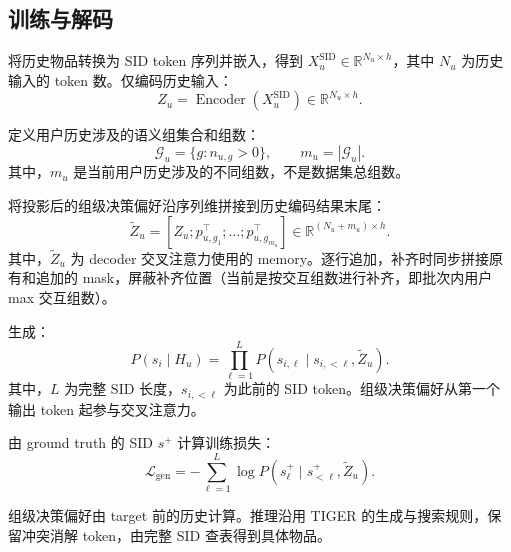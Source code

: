\documentclass[UTF8,11pt,a4paper]{ctexart}
\begin{document}
\subsection{训练与解码}

将历史物品转换为 SID token 序列并嵌入，得到 $X_u^{\mathrm{SID}}\in\mathbb R^{N_u\times h}$，其中 $N_u$ 为历史输入的 token 数。仅编码历史输入：
\begin{equation}
 Z_u=\operatorname{Encoder}(X_u^{\mathrm{SID}})
 \in\mathbb R^{N_u\times h}.
\end{equation}

定义用户历史涉及的语义组集合和组数：
\begin{equation}
 \mathcal G_u=\{g:n_{u,g}>0\},\qquad m_u=|\mathcal G_u|.
\end{equation}
其中，$m_u$ 是当前用户历史涉及的不同组数，不是数据集总组数。

将投影后的组级决策偏好沿序列维拼接到历史编码结果末尾：
\begin{equation}
 \widetilde Z_u=
 [Z_u;p_{u,g_1}^{\top};\ldots;p_{u,g_{m_u}}^{\top}]
 \in\mathbb R^{(N_u+m_u)\times h}.
\end{equation}
其中，$\widetilde Z_u$ 为 decoder 交叉注意力使用的 memory。逐行追加，补齐时同步拼接原有和追加的 mask，屏蔽补齐位置（当前是按交互组数进行补齐，即批次内用户 max 交互组数）。

生成：
\begin{equation}
 P(s_i\mid H_u)=\prod_{\ell=1}^{L}
 P(s_{i,\ell}\mid s_{i,<\ell},\widetilde Z_u).
\end{equation}
其中，$L$ 为完整 SID 长度，$s_{i,<\ell}$ 为此前的 SID token。组级决策偏好从第一个输出 token 起参与交叉注意力。

由 ground truth 的 SID $s^+$ 计算训练损失：
\begin{equation}
 \mathcal L_{\mathrm{gen}}=-\sum_{\ell=1}^{L}
 \log P(s^+_\ell\mid s^+_{<\ell},\widetilde Z_u).
\end{equation}

组级决策偏好由 target 前的历史计算。推理沿用 TIGER 的生成与搜索规则，保留冲突消解 token，由完整 SID 查表得到具体物品。
\end{document}
